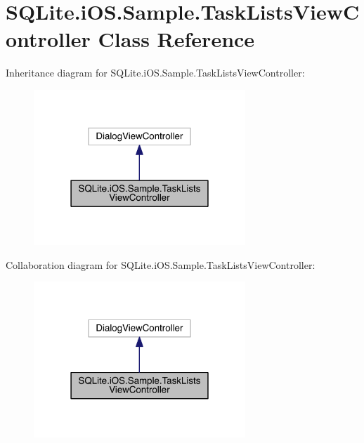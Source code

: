 \hypertarget{class_s_q_lite_1_1i_o_s_1_1_sample_1_1_task_lists_view_controller}{\section{S\+Q\+Lite.\+i\+O\+S.\+Sample.\+Task\+Lists\+View\+Controller Class Reference}
\label{class_s_q_lite_1_1i_o_s_1_1_sample_1_1_task_lists_view_controller}
}


Inheritance diagram for S\+Q\+Lite.\+i\+O\+S.\+Sample.\+Task\+Lists\+View\+Controller\+:
\nopagebreak
\begin{figure}[H]
\begin{center}
\leavevmode
\includegraphics[width=226pt]{class_s_q_lite_1_1i_o_s_1_1_sample_1_1_task_lists_view_controller__inherit__graph}
\end{center}
\end{figure}


Collaboration diagram for S\+Q\+Lite.\+i\+O\+S.\+Sample.\+Task\+Lists\+View\+Controller\+:
\nopagebreak
\begin{figure}[H]
\begin{center}
\leavevmode
\includegraphics[width=226pt]{class_s_q_lite_1_1i_o_s_1_1_sample_1_1_task_lists_view_controller__coll__graph}
\end{center}
\end{figure}
